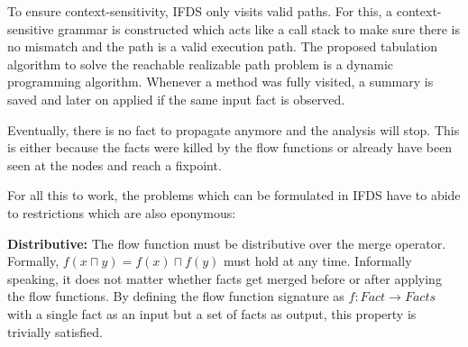\documentclass[../draft.tex]{subfiles}
\begin{document}
    To ensure context-sensitivity, IFDS only visits valid paths. For this, a context-sensitive grammar is constructed which acts like a call stack to make sure there is no mismatch and the path is a valid execution path.
    The proposed tabulation algorithm to solve the reachable realizable path problem is a dynamic programming algorithm. Whenever a method was fully visited, a summary is saved and later on applied if the same input fact is observed. 

    Eventually, there is no fact to propagate anymore and the analysis will stop. This is either because the facts were killed by the flow functions or already have been seen at the nodes and reach a fixpoint.

    For all this to work, the problems which can be formulated in IFDS have to abide to restrictions which are also eponymous:

    \textbf{Distributive:} The flow function must be distributive over the merge operator. Formally, $f(x \sqcap y) = f(x) \sqcap f(y)$ must hold at any time. Informally speaking, it does not matter whether facts get merged before or after applying the flow functions. By defining the flow function signature as $f: \mathit{Fact} \rightarrow \mathit{Facts}$ with a single fact as an input but a set of facts as output, this property is trivially satisfied.
\end{document}
